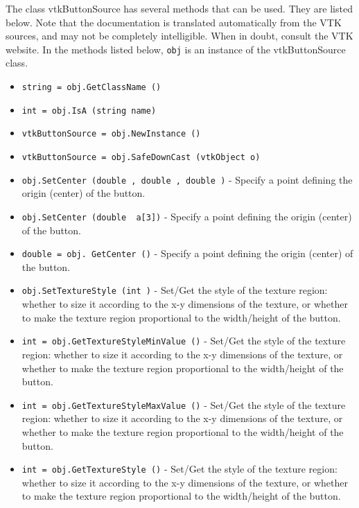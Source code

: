 The class vtkButtonSource has several methods that can be used.
  They are listed below.
Note that the documentation is translated automatically from the VTK sources,
and may not be completely intelligible.  When in doubt, consult the VTK website.
In the methods listed below, \verb|obj| is an instance of the vtkButtonSource class.
\begin{itemize}
\item  \verb|string = obj.GetClassName ()|

\item  \verb|int = obj.IsA (string name)|

\item  \verb|vtkButtonSource = obj.NewInstance ()|

\item  \verb|vtkButtonSource = obj.SafeDownCast (vtkObject o)|

\item  \verb|obj.SetCenter (double , double , double )| -  Specify a point defining the origin (center) of the button.

\item  \verb|obj.SetCenter (double  a[3])| -  Specify a point defining the origin (center) of the button.

\item  \verb|double = obj. GetCenter ()| -  Specify a point defining the origin (center) of the button.

\item  \verb|obj.SetTextureStyle (int )| -  Set/Get the style of the texture region: whether to size it
 according to the x-y dimensions of the texture, or whether to make
 the texture region proportional to the width/height of the button.

\item  \verb|int = obj.GetTextureStyleMinValue ()| -  Set/Get the style of the texture region: whether to size it
 according to the x-y dimensions of the texture, or whether to make
 the texture region proportional to the width/height of the button.

\item  \verb|int = obj.GetTextureStyleMaxValue ()| -  Set/Get the style of the texture region: whether to size it
 according to the x-y dimensions of the texture, or whether to make
 the texture region proportional to the width/height of the button.

\item  \verb|int = obj.GetTextureStyle ()| -  Set/Get the style of the texture region: whether to size it
 according to the x-y dimensions of the texture, or whether to make
 the texture region proportional to the width/height of the button.


\end{itemize}
